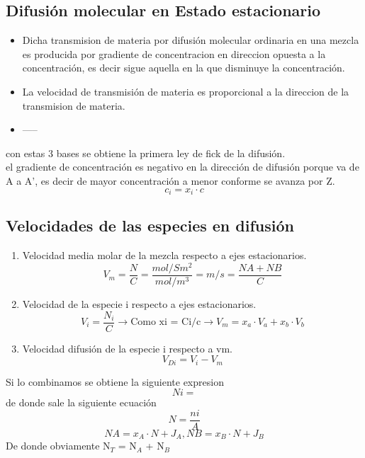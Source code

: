 \documentclass{report}
\begin{document}
\subsection{Difusión molecular en Estado estacionario}
\begin{raggedright}
	\begin{itemize}
		\item Dicha transmision de materia por difusión molecular ordinaria en una mezcla es producida por gradiente de concentracion
		en direccion opuesta a la concentración, es decir sigue aquella en la que disminuye la concentración.
		\item La velocidad de transmisión de materia es proporcional a la direccion de la transmision de materia.
		\item -----
	\end{itemize}
con estas 3 bases se obtiene la primera ley de fick de la difusión.\\
el gradiente de concentración es negativo en la dirección de difusión porque va de A a A', es decir de mayor concentración a menor conforme se avanza por Z.\\
\begin{equation*}
	c_i = x_i \cdot c
\end{equation*}
\subsection{Velocidades de las especies en difusión}
\begin{enumerate}
	\item Velocidad media molar de la mezcla respecto a ejes estacionarios.
	\begin{equation*}
		V_m = \frac{N}{C} = \frac{mol/S m^2}{mol/m^3} = m/s = \frac{NA+NB}{C}
	\end{equation*}
	\item Velocidad de la especie i respecto a ejes estacionarios.
	\begin{equation*}
		V_i = \frac{N_i}{C} \rightarrow \text{Como xi = Ci/c} \rightarrow V_m = x_a \cdot V_a + x_b \cdot V_b
	\end{equation*}
	\item Velocidad difusión de la especie i respecto a vm.
	\begin{equation*}
		V_{Di} = V_i - V_m 
	\end{equation*}
\end{enumerate}
Si lo combinamos se obtiene la siguiente expresion 
\begin{equation*}
	Ni = %
\end{equation*}
de donde sale la siguiente ecuación 
\begin{equation*}
	N = \frac{ni}{A} %
\end{equation*}
\begin{equation*}
	NA = x_A \cdot N + J_A , NB = x_B \cdot N + J_B
\end{equation*}
De donde obviamente N$_T$ = N$_A$ + N$_B$ 

\end{raggedright}
\end{document}
